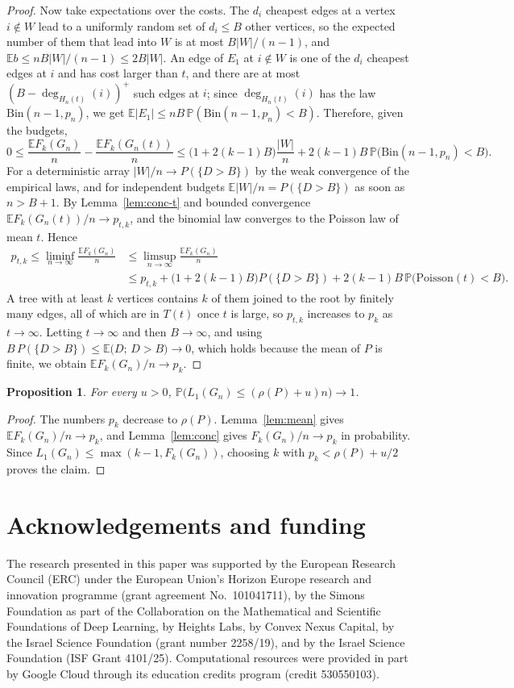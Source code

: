\documentclass[11pt]{amsart}
\newtheorem{proposition}[theorem]{Proposition}
\theoremstyle{remark}
\numberwithin{equation}{section}
\newcommand{\E}{\mathbb E}
\newcommand{\Pp}{\mathbb P}
\newcommand{\1}{\mathbf 1}
\begin{document}
\begin{proof}
Now take expectations over the costs. The $d_i$ cheapest edges at a vertex $i\notin W$ lead to a uniformly random set of $d_i\le B$ other vertices, so the expected number of them that lead into $W$ is at most $B|W|/(n-1)$, and $\E b\le nB|W|/(n-1)\le2B|W|$. An edge of $E_1$ at $i\notin W$ is one of the $d_i$ cheapest edges at $i$ and has cost larger than $t$, and there are at most $(B-\deg_{H_n(t)}(i))^+$ such edges at $i$; since $\deg_{H_n(t)}(i)$ has the law $\mathrm{Bin}(n-1,p_n)$, we get $\E|E_1|\le nB\,\Pp(\mathrm{Bin}(n-1,p_n)<B)$. Therefore, given the budgets,
\[
0\le\frac{\E F_k(G_n)}n-\frac{\E F_k(G_n(t))}n\le\bigl(1+2(k-1)B\bigr)\frac{|W|}n+2(k-1)B\,\Pp\bigl(\mathrm{Bin}(n-1,p_n)<B\bigr).
\]
For a deterministic array $|W|/n\to P(\{D>B\})$ by the weak convergence of the empirical laws, and for independent budgets $\E|W|/n=P(\{D>B\})$ as soon as $n>B+1$. By Lemma~\ref{lem:conc-t} and bounded convergence $\E F_k(G_n(t))/n\to p_{t,k}$, and the binomial law converges to the Poisson law of mean $t$. Hence
\begin{align*}
p_{t,k}\le\liminf_{n\to\infty}\frac{\E F_k(G_n)}n&\le\limsup_{n\to\infty}\frac{\E F_k(G_n)}n\\
&\le p_{t,k}+\bigl(1+2(k-1)B\bigr)P(\{D>B\})+2(k-1)B\,\Pp\bigl(\mathrm{Poisson}(t)<B\bigr).
\end{align*}
A tree with at least $k$ vertices contains $k$ of them joined to the root by finitely many edges, all of which are in $T(t)$ once $t$ is large, so $p_{t,k}$ increases to $p_k$ as $t\to\infty$. Letting $t\to\infty$ and then $B\to\infty$, and using $B\,P(\{D>B\})\le\E\bigl(D;\,D>B\bigr)\to0$, which holds because the mean of $P$ is finite, we obtain $\E F_k(G_n)/n\to p_k$.
\end{proof}

\begin{proposition}\label{prop:upper}
For every $u>0$, $\Pp\bigl(L_1(G_n)\le(\rho(P)+u)n\bigr)\to1$.
\end{proposition}

\begin{proof}
The numbers $p_k$ decrease to $\rho(P)$. Lemma~\ref{lem:mean} gives $\E F_k(G_n)/n\to p_k$, and Lemma~\ref{lem:conc} gives $F_k(G_n)/n\to p_k$ in probability. Since $L_1(G_n)\le\max(k-1,F_k(G_n))$, choosing $k$ with $p_k<\rho(P)+u/2$ proves the claim.
\end{proof}

\section*{Acknowledgements and funding}
The research presented in this paper was supported by the European Research
Council (ERC) under the European Union's Horizon Europe research and
innovation programme (grant agreement No.~101041711), by the Simons
Foundation as part of the Collaboration on the Mathematical and Scientific
Foundations of Deep Learning, by Heights Labs, by Convex Nexus Capital, by
the Israel Science Foundation (grant number 2258/19), and by the Israel
Science Foundation (ISF Grant 4101/25). Computational resources were
provided in part by Google Cloud through its education credits program
(credit 530550103).
\end{document}
